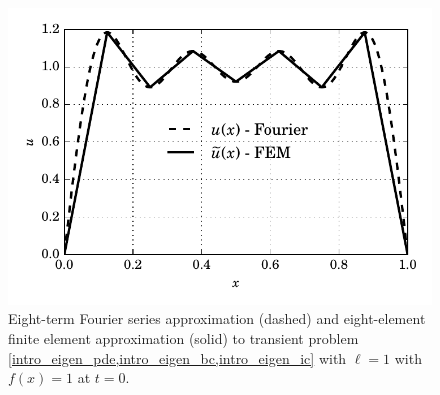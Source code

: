\begin{figure}
  \centering
    \includegraphics[width=0.7\linewidth]{images/fenics_intro/eigen_solution.pdf}
  \caption[Comparison of FEM with Fourier series solution]{Eight-term Fourier series approximation (dashed) and eight-element finite element approximation (solid) to transient problem \cref{intro_eigen_pde,intro_eigen_bc,intro_eigen_ic} with $\ell = 1$ with $f(x)=1$ at $t=0$.}
  \label{1d_example_eigensolution}
\end{figure}
